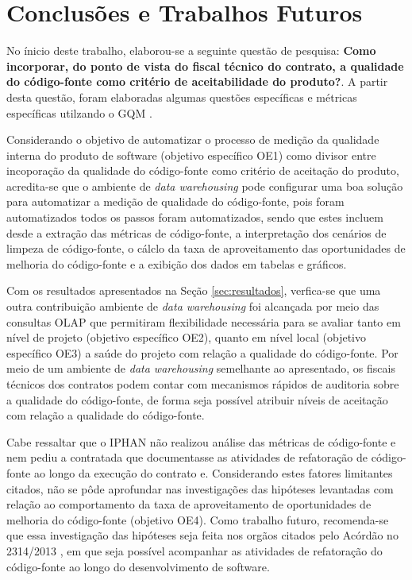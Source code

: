 \section{Conclusões e Trabalhos Futuros}

No ínicio deste trabalho, elaborou-se a seguinte questão de pesquisa: \textbf{Como incorporar, do ponto de vista do fiscal técnico do contrato, a qualidade do código-fonte como critério de aceitabilidade do produto?}. A partir desta questão, foram elaboradas algumas questões específicas e métricas específicas utilzando o GQM \cite{Basili96b}.

Considerando o objetivo de automatizar o processo de medição da qualidade interna do produto de software (objetivo específico OE1) como divisor entre incoporação da qualidade do código-fonte como critério de aceitação do produto, acredita-se que o ambiente de \textit{data warehousing} pode configurar uma boa solução para automatizar a medição de qualidade do código-fonte, pois foram automatizados todos os passos foram automatizados, sendo que estes incluem desde a extração das métricas de código-fonte, a interpretação dos cenários de limpeza de código-fonte, o cálclo da taxa de aproveitamento das oportunidades de melhoria do código-fonte e a exibição dos dados em tabelas e gráficos.

Com os resultados apresentados na Seção \ref{sec:resultados}, verfica-se que uma outra contribuição ambiente de \textit{data warehousing} foi alcançada por meio das consultas OLAP que permitiram flexibilidade necessária para se avaliar tanto em nível de projeto (objetivo específico OE2), quanto em nível local (objetivo específico OE3) a saúde do projeto com relação a qualidade do código-fonte. Por meio de um ambiente de \textit{data warehousing} semelhante ao apresentado, os fiscais técnicos dos contratos podem contar com mecanismos rápidos de auditoria sobre a qualidade do código-fonte, de forma seja possível atribuir níveis de aceitação com relação a qualidade do código-fonte. 

Cabe ressaltar que o IPHAN não realizou análise das métricas de código-fonte e nem pediu a contratada que documentasse as atividades de refatoração de código-fonte ao longo da execução do contrato e. Considerando estes fatores limitantes citados, não se pôde aprofundar nas investigações das hipóteses levantadas com relação ao comportamento da taxa de aproveitamento de oportunidades de melhoria do código-fonte (objetivo OE4). Como trabalho futuro, recomenda-se que essa investigação das hipóteses seja feita nos orgãos citados pelo Acórdão no 2314/2013 \cite{TCU:2013}, em que seja possível acompanhar as atividades de refatoração do código-fonte ao longo do desenvolvimento de software.
